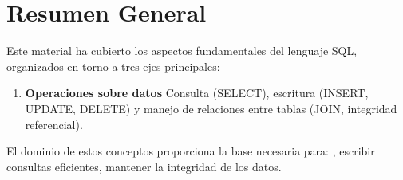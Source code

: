 \documentclass[12pt, a4paper]{article}
\begin{document}
    
	\section*{Resumen General}
	
	Este material ha cubierto los aspectos fundamentales del lenguaje SQL,
	organizados en torno a tres ejes principales:
	
	\begin{enumerate}

		\item \textbf{Operaciones sobre datos}  Consulta (SELECT),
		escritura (INSERT, UPDATE, DELETE) y manejo de relaciones entre
		tablas (JOIN, integridad referencial).
		
	\end{enumerate}
	
	El dominio de estos conceptos proporciona la base necesaria para:
	, escribir consultas eficientes, mantener la integridad de los datos.
	
	\newpage
	\printbibliography
	
\end{document}
